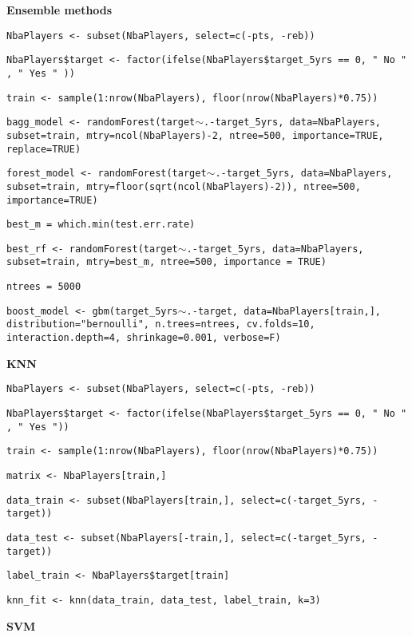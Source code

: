 \noindent
\textbf{Ensemble methods}

\begin{center}
\texttt{NbaPlayers <- subset(NbaPlayers, select=c(-pts, -reb))}

\texttt{NbaPlayers\$target <- factor(ifelse(NbaPlayers\$target\_5yrs == 0, " No " , " Yes " ))}

\texttt{train <- sample(1:nrow(NbaPlayers), floor(nrow(NbaPlayers)*0.75))}

\texttt{bagg\_model <- randomForest(target$\sim$.-target\_5yrs, data=NbaPlayers, subset=train, mtry=ncol(NbaPlayers)-2, ntree=500, importance=TRUE, replace=TRUE)}

\texttt{forest\_model <- randomForest(target$\sim$.-target\_5yrs, data=NbaPlayers, subset=train, mtry=floor(sqrt(ncol(NbaPlayers)-2)), ntree=500, importance=TRUE)}

\texttt{best\_m = which.min(test.err.rate)}

\texttt{best\_rf <- randomForest(target$\sim$.-target\_5yrs, data=NbaPlayers, subset=train, mtry=best\_m, ntree=500, importance = TRUE)}

\texttt{ntrees = 5000}

\texttt{boost\_model <- gbm(target\_5yrs$\sim$.-target, data=NbaPlayers[train,], distribution="bernoulli", n.trees=ntrees, cv.folds=10, interaction.depth=4, shrinkage=0.001, verbose=F)}
\end{center}
	
\noindent
\textbf{KNN}

\begin{center}
\texttt{NbaPlayers <- subset(NbaPlayers, select=c(-pts, -reb))}

\texttt{NbaPlayers\$target <- factor(ifelse(NbaPlayers\$target\_5yrs == 0, " No " , " Yes "))}

\texttt{train <- sample(1:nrow(NbaPlayers), floor(nrow(NbaPlayers)*0.75))}

\texttt{matrix <- NbaPlayers[train,]}

\texttt{data\_train <- subset(NbaPlayers[train,], select=c(-target\_5yrs, -target))} 

\texttt{data\_test <- subset(NbaPlayers[-train,], select=c(-target\_5yrs, -target))}

\texttt{label\_train <- NbaPlayers\$target[train]}

\texttt{knn\_fit <- knn(data\_train, data\_test, label\_train, k=3)}
\end{center}
	
\noindent
\textbf{SVM}

